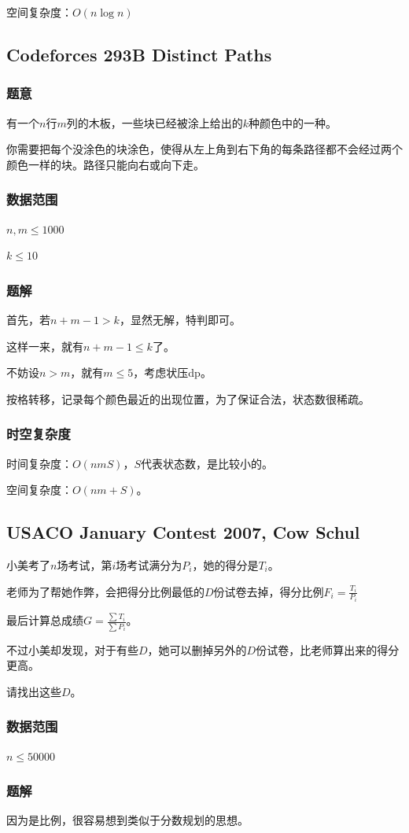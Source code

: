 \documentclass{ctexart}
\begin{document}
空间复杂度：$O(n \log n)$
\subsection{Codeforces 293B Distinct Paths}
\subsubsection{题意}
有一个$n$行$m$列的木板，一些块已经被涂上给出的$k$种颜色中的一种。

你需要把每个没涂色的块涂色，使得从左上角到右下角的每条路径都不会经过两个颜色一样的块。路径只能向右或向下走。
\subsubsection{数据范围}
$n,m \le 1000$

$k \le 10$
\subsubsection{题解}
首先，若$n+m-1 > k$，显然无解，特判即可。

这样一来，就有$n+m-1 \le k$了。

不妨设$n>m$，就有$m \le 5$，考虑状压dp。

按格转移，记录每个颜色最近的出现位置，为了保证合法，状态数很稀疏。
\subsubsection{时空复杂度}
时间复杂度：$O(nmS)$，$S$代表状态数，是比较小的。

空间复杂度：$O(nm+S)$。
\subsection{USACO January Contest 2007, Cow Schul}
小美考了$n$场考试，第$i$场考试满分为$P_i$，她的得分是$T_i$。

老师为了帮她作弊，会把得分比例最低的$D$份试卷去掉，得分比例$F_i=\frac{T_i}{P_i}$

最后计算总成绩$G=\frac{\sum T_i}{\sum P_i}$。

不过小美却发现，对于有些$D$，她可以删掉另外的$D$份试卷，比老师算出来的得分更高。

请找出这些$D$。
\subsubsection{数据范围}
$n \le 50000$
\subsubsection{题解}
因为是比例，很容易想到类似于分数规划的思想。
\end{document}
